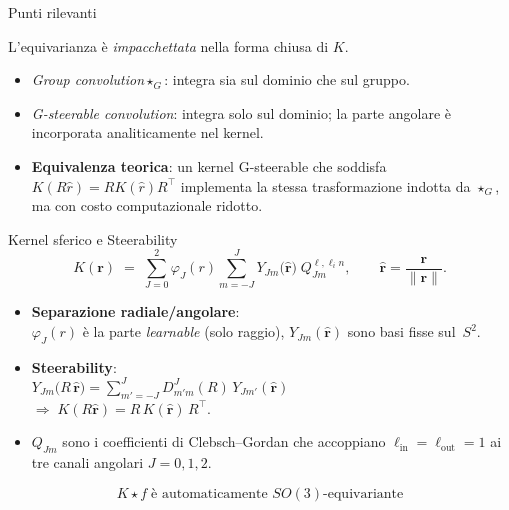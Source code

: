 \documentclass[aspectratio=32,8pt]{beamer}
\begin{document}
\begin{frame}{Punti rilevanti}
\begin{enumerate}
\begin{itemize}
        L’equivarianza è \emph{impacchettata} nella forma chiusa di \(K\).

  \end{itemize}
  \vspace{4pt}

\end{enumerate}
        \begin{itemize}
              \item \emph{Group convolution}\(\star_G\): integra sia sul dominio che sul gruppo.
              \item \emph{G-steerable convolution}: integra solo sul dominio; la parte angolare è incorporata analiticamente nel kernel.
              \item \textbf{Equivalenza teorica}: un kernel G-steerable che soddisfa \(K(R\hat r)=R K(\hat r)R^{\!\top}\) implementa la stessa trasformazione indotta da \(\star_G\), ma con costo computazionale ridotto.
        \end{itemize}
\end{frame}


\begin{frame}[fragile]{Kernel sferico e Steerability}
\small
\[
  K(\mathbf r)
  \;=\;
  \sum_{J=0}^{2} \varphi_J(r)
  \sum_{m=-J}^{J}
  Y_{Jm}\!\bigl(\hat{\mathbf r}\bigr)\;
  Q_{Jm}^{\ell,\ell_in},
  \qquad
  \hat{\mathbf r}=\frac{\mathbf r}{\lVert\mathbf r\rVert}.
\]

\begin{itemize}
  \item \textbf{Separazione radiale/angolare}:\\[2pt]
        $\varphi_J(r)$ è la parte \emph{learnable} (solo raggio),  
        $Y_{Jm}(\hat{\mathbf r})$ sono basi fisse sul $S^2$.
  \item \textbf{Steerability}:\\[2pt]
        $Y_{Jm}\bigl(R\,\hat{\mathbf r}\bigr)
        =\displaystyle\sum_{m'=-J}^{J} D^{J}_{m'm}(R)\,Y_{Jm'}(\hat{\mathbf r})$\\
        $\Longrightarrow\;
        K(R\hat{\mathbf r}) = R\,K(\hat{\mathbf r})\,R^{\!\top}$.
  \item $Q_{Jm}$ sono i coefficienti di Clebsch–Gordan che accoppiano
        $\ell_{\text{in}}=\ell_{\text{out}}=1$ 
        ai tre canali angolari $J=0,1,2$.
\end{itemize}

\[
  \boxed{\;K\star f \;\text{è automaticamente }SO(3)\text{-equivariante}\;}
\]
\end{frame}
\end{document}
